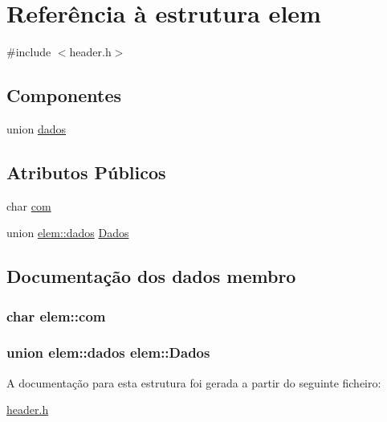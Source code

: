 \hypertarget{structelem}{\section{Referência à estrutura elem}
\label{structelem}
}


{\ttfamily \#include $<$header.\-h$>$}

\subsection*{Componentes}
\begin{DoxyCompactItemize}
\item 
union \hyperlink{unionelem_1_1dados}{dados}
\end{DoxyCompactItemize}
\subsection*{Atributos Públicos}
\begin{DoxyCompactItemize}
\item 
char \hyperlink{structelem_a4d60b238c774307947c9019b3c34e1f6}{com}
\item 
union \hyperlink{unionelem_1_1dados}{elem\-::dados} \hyperlink{structelem_ab01d842326a8e8bff4f514bf673173f8}{Dados}
\end{DoxyCompactItemize}


\subsection{Documentação dos dados membro}
\hypertarget{structelem_a4d60b238c774307947c9019b3c34e1f6}{
\subsubsection[{com}]{\setlength{\rightskip}{0pt plus 5cm}char elem\-::com}}\label{structelem_a4d60b238c774307947c9019b3c34e1f6}
\hypertarget{structelem_ab01d842326a8e8bff4f514bf673173f8}{
\subsubsection[{Dados}]{\setlength{\rightskip}{0pt plus 5cm}union {\bf elem\-::dados} elem\-::\-Dados}}\label{structelem_ab01d842326a8e8bff4f514bf673173f8}


A documentação para esta estrutura foi gerada a partir do seguinte ficheiro\-:\begin{DoxyCompactItemize}
\item 
\hyperlink{header_8h}{header.\-h}\end{DoxyCompactItemize}
